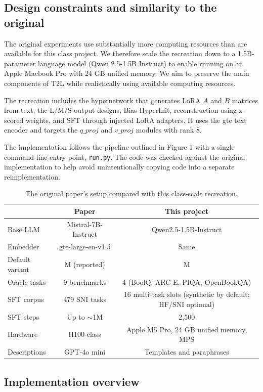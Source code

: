 \documentclass{article}
\begin{document}
\subsection{Design constraints and similarity to the original}

The original experiments use substantially more computing resources than are available for this class project. We therefore scale the recreation down to a 1.5B-parameter language model (Qwen 2.5-1.5B Instruct) to enable running on an Apple Macbook Pro with 24 GB unified memory. We aim to preserve the main components of T2L while realistically using available computing resources.

The recreation includes the hypernetwork that generates LoRA $A$ and $B$ matrices from text, the L/M/S output designs, Bias-HyperInit, reconstruction using z-scored weights, and SFT through injected LoRA adapters. It uses the gte text encoder and targets the $q\_proj$ and $v\_proj$ modules with rank $8$.

The implementation follows the pipeline outlined in Figure 1 with a single command-line entry point, \texttt{run.py}. The code was checked against the original implementation to help avoid unintentionally copying code into a separate reimplementation.

\begin{table}[t]
\centering
\caption{The original paper's setup compared with this class-scale recreation.}
\label{tab:scale}
\begin{tabular}{lcc}
\toprule
 & Paper & This project \\
\midrule
Base LLM & Mistral-7B-Instruct & Qwen2.5-1.5B-Instruct \\
Embedder & gte-large-en-v1.5 & Same \\
Default variant & M (reported) & M \\
Oracle tasks & 9 benchmarks & 4 (BoolQ, ARC-E, PIQA, OpenBookQA) \\
SFT corpus & 479 SNI tasks & 16 multi-task slots (synthetic by default; HF/SNI optional) \\
SFT steps & Up to $\sim$1M & 2,500 \\
Hardware & H100-class & Apple M5 Pro, 24 GB unified memory, MPS \\
Descriptions & GPT-4o mini & Templates and paraphrases \\
\bottomrule
\end{tabular}
\end{table}

\subsection{Implementation overview}
\end{document}
